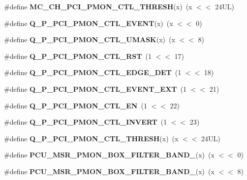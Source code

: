 \begin{DoxyCompactItemize}
\item 
\mbox{\label{types_8h_a4703fc1a4abb93c3da21b88a6c1bdffa}} 
\#define {\bfseries M\+C\+\_\+\+C\+H\+\_\+\+P\+C\+I\+\_\+\+P\+M\+O\+N\+\_\+\+C\+T\+L\+\_\+\+T\+H\+R\+E\+SH}(x)~(x $<$$<$ 24\+U\+L)
\item 
\mbox{\label{types_8h_ab7f3a6b3342d5c302104b7842987b5b8}} 
\#define {\bfseries Q\+\_\+\+P\+\_\+\+P\+C\+I\+\_\+\+P\+M\+O\+N\+\_\+\+C\+T\+L\+\_\+\+E\+V\+E\+NT}(x)~(x $<$$<$ 0)
\item 
\mbox{\label{types_8h_adb49550b5c697b728cca4761126f41d7}} 
\#define {\bfseries Q\+\_\+\+P\+\_\+\+P\+C\+I\+\_\+\+P\+M\+O\+N\+\_\+\+C\+T\+L\+\_\+\+U\+M\+A\+SK}(x)~(x $<$$<$ 8)
\item 
\mbox{\label{types_8h_abc1887d2528818b68ba13e34d5a575a1}} 
\#define {\bfseries Q\+\_\+\+P\+\_\+\+P\+C\+I\+\_\+\+P\+M\+O\+N\+\_\+\+C\+T\+L\+\_\+\+R\+ST}~(1 $<$$<$ 17)
\item 
\mbox{\label{types_8h_a129f0786cdfaa6d9a5aa7ae2340ae2ba}} 
\#define {\bfseries Q\+\_\+\+P\+\_\+\+P\+C\+I\+\_\+\+P\+M\+O\+N\+\_\+\+C\+T\+L\+\_\+\+E\+D\+G\+E\+\_\+\+D\+ET}~(1 $<$$<$ 18)
\item 
\mbox{\label{types_8h_a6f393387567839622066d15c749ae1d5}} 
\#define {\bfseries Q\+\_\+\+P\+\_\+\+P\+C\+I\+\_\+\+P\+M\+O\+N\+\_\+\+C\+T\+L\+\_\+\+E\+V\+E\+N\+T\+\_\+\+E\+XT}~(1 $<$$<$ 21)
\item 
\mbox{\label{types_8h_ab0ea8d2d83fd6ac529248e1374dbdf3c}} 
\#define {\bfseries Q\+\_\+\+P\+\_\+\+P\+C\+I\+\_\+\+P\+M\+O\+N\+\_\+\+C\+T\+L\+\_\+\+EN}~(1 $<$$<$ 22)
\item 
\mbox{\label{types_8h_abdb99ce46d65242a12d5b9d7320be907}} 
\#define {\bfseries Q\+\_\+\+P\+\_\+\+P\+C\+I\+\_\+\+P\+M\+O\+N\+\_\+\+C\+T\+L\+\_\+\+I\+N\+V\+E\+RT}~(1 $<$$<$ 23)
\item 
\mbox{\label{types_8h_a519775439b97120154571709922c5129}} 
\#define {\bfseries Q\+\_\+\+P\+\_\+\+P\+C\+I\+\_\+\+P\+M\+O\+N\+\_\+\+C\+T\+L\+\_\+\+T\+H\+R\+E\+SH}(x)~(x $<$$<$ 24\+U\+L)
\item 
\mbox{\label{types_8h_ad803a7d37decfd980f61c179c5b1a3cd}} 
\#define {\bfseries P\+C\+U\+\_\+\+M\+S\+R\+\_\+\+P\+M\+O\+N\+\_\+\+B\+O\+X\+\_\+\+F\+I\+L\+T\+E\+R\+\_\+\+B\+A\+N\+D\+\_}(x)~(x $<$$<$ 0)
\item 
\mbox{\label{types_8h_ac03367f3dad1f3ead4d9ad72d399247d}} 
\#define {\bfseries P\+C\+U\+\_\+\+M\+S\+R\+\_\+\+P\+M\+O\+N\+\_\+\+B\+O\+X\+\_\+\+F\+I\+L\+T\+E\+R\+\_\+\+B\+A\+N\+D\+\_}(x)~(x $<$$<$ 8)
\item 
\mbox{\label{types_8h_aace8b49d5adbd42496512163acec16a1}} 
$$
\end{DoxyCompactItemize}
